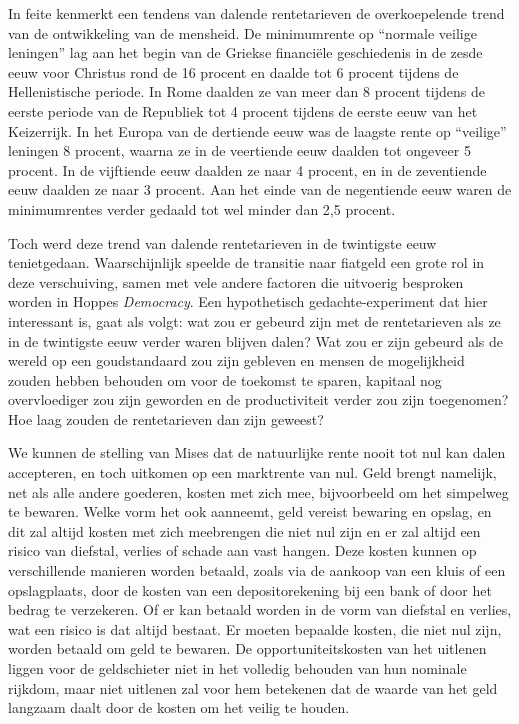 \begin{blockquotebox}
    In feite kenmerkt een tendens van dalende rentetarieven de overkoepelende trend van de ontwikkeling van de mensheid. De minimumrente op ``normale veilige leningen'' lag aan het begin van de Griekse financiële geschiedenis in de zesde eeuw voor Christus rond de 16 procent en daalde tot 6 procent tijdens de Hellenistische periode. In Rome daalden ze van meer dan 8 procent tijdens de eerste periode van de Republiek tot 4 procent tijdens de eerste eeuw van het Keizerrijk. In het Europa van de dertiende eeuw was de laagste rente op ``veilige'' leningen 8 procent, waarna ze in de veertiende eeuw daalden tot ongeveer 5 procent. In de vijftiende eeuw daalden ze naar 4 procent, en in de zeventiende eeuw daalden ze naar 3 procent. Aan het einde van de negentiende eeuw waren de minimumrentes verder gedaald tot wel minder dan 2,5 procent.\footnotemark
\end{blockquotebox}

Toch werd deze trend van dalende rentetarieven in de twintigste eeuw tenietgedaan. Waarschijnlijk speelde de transitie naar fiatgeld een grote rol in deze verschuiving, samen met vele andere factoren die uitvoerig besproken worden in Hoppe\textquotesingle s \emph{Democracy}. Een hypothetisch gedachte-experiment dat hier interessant is, gaat als volgt: wat zou er gebeurd zijn met de rentetarieven als ze in de twintigste eeuw verder waren blijven dalen? Wat zou er zijn gebeurd als de wereld op een goudstandaard zou zijn gebleven en mensen de mogelijkheid zouden hebben behouden om voor de toekomst te sparen, kapitaal nog overvloediger zou zijn geworden en de productiviteit verder zou zijn toegenomen? Hoe laag zouden de rentetarieven dan zijn geweest?

We kunnen de stelling van Mises dat de natuurlijke rente nooit tot nul kan dalen accepteren, en toch uitkomen op een marktrente van nul. Geld brengt namelijk, net als alle andere goederen, kosten met zich mee, bijvoorbeeld om het simpelweg te bewaren. Welke vorm het ook aanneemt, geld vereist bewaring en opslag, en dit zal altijd kosten met zich meebrengen die niet nul zijn en er zal altijd een risico van diefstal, verlies of schade aan vast hangen. Deze kosten kunnen op verschillende manieren worden betaald, zoals via de aankoop van een kluis of een opslagplaats, door de kosten van een depositorekening bij een bank of door het bedrag te verzekeren. Of er kan betaald worden in de vorm van diefstal en verlies, wat een risico is dat altijd bestaat. Er moeten bepaalde kosten, die niet nul zijn, worden betaald om geld te bewaren. De opportuniteitskosten van het uitlenen liggen voor de geldschieter niet in het volledig behouden van hun nominale rijkdom, maar niet uitlenen zal voor hem betekenen dat de waarde van het geld langzaam daalt door de kosten om het veilig te houden.

